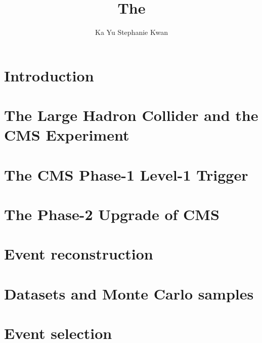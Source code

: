 \documentclass[12pt,lot,lof]{puthesis}
\title{The}
\author{Ka Yu Stephanie Kwan}
\begin{document}
\chapter{Introduction}


\chapter{The Large Hadron Collider and the CMS Experiment}


\chapter{The CMS Phase-1 Level-1 Trigger}


\chapter{The Phase-2 Upgrade of CMS}


\chapter{Event reconstruction}


\chapter{Datasets and Monte Carlo samples}


\chapter{Event selection}

% 


 \label{bib}
\end{document}
